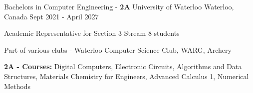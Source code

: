 

\begin{cventries}

  \cventry
    {Bachelors in Computer Engineering - \textbf{2A}} %
    {University of Waterloo} %
    {Waterloo, Canada} %
    {Sept 2021 - April 2027} %
    {
      \begin{cvitems} %
        \item {Academic Representative for Section 3 Stream 8 students}
        \item {Part of various clubs - Waterloo Computer Science Club, WARG, Archery}
        \item {\textbf{2A - Courses:} Digital Computers, Electronic Circuits, Algorithms and Data Structures, Materials Chemistry for Engineers, Advanced Calculus 1, Numerical Methods}
      \end{cvitems}
    }
    
\end{cventries}
